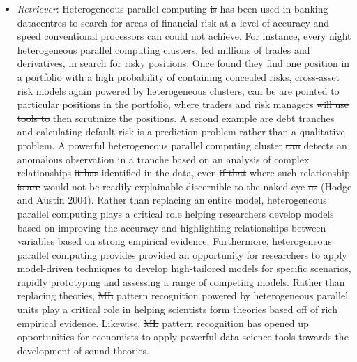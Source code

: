 \documentclass[10pt]{article}[draft]
\begin{document}
\begin{itemize}
	\item \emph{Retriever}: Heterogeneous parallel computing  \st{is} has been used in banking datacentres to search for areas of financial risk at a level of accuracy and speed conventional processors \st{can} could not achieve. For instance, every night heterogeneous parallel computing clusters, fed millions of trades and derivatives,  \st{in} search for risky positions. Once found \st{they find one position} in a portfolio with a high probability of containing concealed risks, cross-asset risk models  again powered by heterogeneous clusters, \st{can be} are pointed to particular positions in the portfolio, where traders  and risk managers \st{will use tools to} then scrutinize the positions. A second example are debt tranches and calculating default risk is a prediction problem rather than a qualitative problem. A powerful heterogeneous parallel computing cluster \st{can} detects an anomalous observation in a tranche based on an analysis of complex relationships \st{it has} identified in the data, even \st{if that} where such relationship \st{is are} would not be readily explainable discernible to the naked eye \st{us} (Hodge and Austin 2004). Rather than replacing an entire model, heterogeneous parallel computing plays a critical role helping researchers develop models based on improving the accuracy and highlighting relationships between variables based on strong empirical evidence. Furthermore, heterogeneous parallel computing \st{provides} provided an opportunity for researchers to apply model-driven techniques to develop high-tailored models for specific scenarios, rapidly prototyping and assessing a range of competing models.  Rather than replacing theories, \st{ML} pattern recognition powered by heterogeneous parallel  units play a critical role in helping scientists form theories based off of rich empirical evidence. Likewise, \st{ML} pattern recognition has opened up opportunities for economists to apply powerful data science tools towards the development of sound theories.
\end{itemize}



	
\newpage
\end{document}
